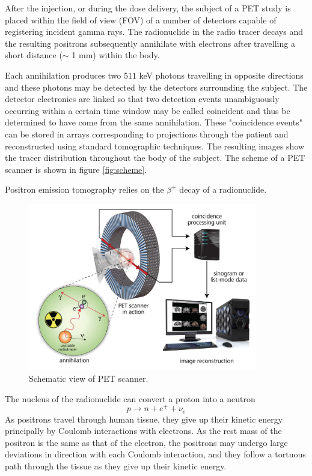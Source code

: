 After the injection, or during the dose delivery, the subject of a PET study is placed within the field of view (FOV) of a number of detectors capable of registering incident gamma rays. The radionuclide in the radio tracer decays and the resulting positrons subsequently annihilate with electrons after travelling a short distance ($\sim$ 1 mm) within the body.

Each annihilation produces two $511$ keV photons travelling in opposite directions and these photons may be detected by the detectors surrounding the subject. The detector electronics are linked so that two detection events unambiguously occurring within a certain time window may be called coincident and thus be determined to have come from the same annihilation. These "coincidence events" can be stored in arrays corresponding to projections through the patient and reconstructed using standard tomographic techniques. The resulting images show the tracer distribution throughout the body of the subject. The scheme of a PET scanner is shown in figure \ref{fig:scheme}.

Positron emission tomography relies on the $\beta ^{+}$ decay of a radionuclide.
\begin{figure}
\centering  
\includegraphics[width=10cm]{Pictures/Chapter_1/PET_scheme}
\caption[PET scanner]{Schematic view of PET scanner.}
\label{fig:PET}
\end{figure}
The nucleus of the radionuclide can convert a proton into a neutron 
\begin{displaymath}
p\rightarrow n + e^{+} + \nu _{e}
\end{displaymath}
As positrons travel through human tissue, they give up their kinetic energy principally by Coulomb interactions with electrons. As the rest mass of the positron is the same as that of the electron, the positrons may undergo large deviations in direction with each Coulomb interaction, and they follow a tortuous path through the tissue as they give up their kinetic energy.

